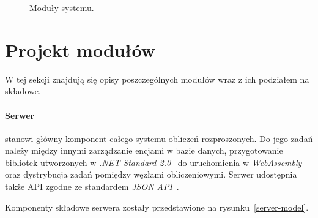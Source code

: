 \documentclass[a4paper,11pt,twoside]{report}
\theoremstyle{definition}
\begin{document}
\begin{figure} 
    \caption{Moduły systemu.}
    \label{project-model}
\end{figure}

\section{Projekt modułów}

W tej sekcji znajdują się opisy poszczególnych modułów wraz z ich podziałem na składowe.

\paragraph{Serwer}

stanowi główny komponent całego systemu obliczeń rozproszonych. Do jego zadań należy między innymi zarządzanie encjami w bazie danych, przygotowanie bibliotek utworzonych w \textit{.NET Standard 2.0}~\cite{dotnet-standard} do uruchomienia w \textit{WebAssembly}~\cite{webassembly} oraz dystrybucja zadań pomiędzy węzłami obliczeniowymi. Serwer udostępnia także API zgodne ze standardem \textit{JSON API}~\cite{jsonapi}.

Komponenty składowe serwera zostały przedstawione na rysunku~\ref{server-model}.
\end{document}
